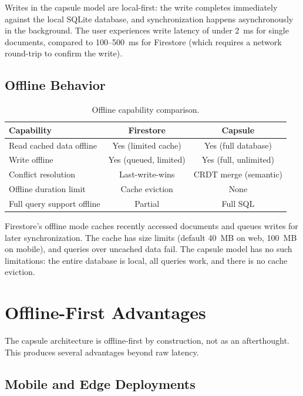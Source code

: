 \documentclass[11pt,a4paper]{article}
\begin{document}
Writes in the capsule model are local-first: the write completes
immediately against the local SQLite database, and synchronization
happens asynchronously in the background. The user experiences write
latency of under 2~ms for single documents, compared to 100--500~ms
for Firestore (which requires a network round-trip to confirm the write).

\subsection{Offline Behavior}

\begin{table}[H]
\centering
\caption{Offline capability comparison.}
\label{tab:offline}
\begin{tabular}{lcc}
\toprule
\textbf{Capability} & \textbf{Firestore} & \textbf{Capsule} \\
\midrule
Read cached data offline & Yes (limited cache) & Yes (full database) \\
Write offline & Yes (queued, limited) & Yes (full, unlimited) \\
Conflict resolution & Last-write-wins & CRDT merge (semantic) \\
Offline duration limit & Cache eviction & None \\
Full query support offline & Partial & Full SQL \\
\bottomrule
\end{tabular}
\end{table}

Firestore's offline mode caches recently accessed documents and queues
writes for later synchronization. The cache has size limits (default 40~MB
on web, 100~MB on mobile), and queries over uncached data fail. The
capsule model has no such limitations: the entire database is local,
all queries work, and there is no cache eviction.

\section{Offline-First Advantages}\label{sec:offline}

The capsule architecture is offline-first by construction, not as an
afterthought. This produces several advantages beyond raw latency.

\subsection{Mobile and Edge Deployments}
\end{document}
